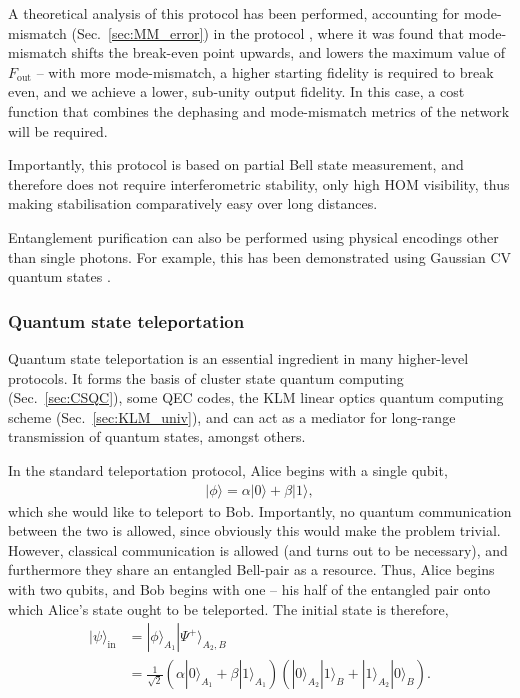 \documentclass[aps,rmp,twocolumn,amsmath,amssymb,nofootinbib,superscriptaddress,longbibliography,floatfix,table-of-contents,eqsecnum]{revtex4-1}
\newcommand{\ket}[1]{|#1\rangle}
\begin{document}
A theoretical analysis of this protocol has been performed, accounting for mode-mismatch (Sec.~\ref{sec:MM_error}) in the protocol \cite{bib:RohdeOptEntPur06}, where it was found that mode-mismatch shifts the break-even point upwards, and lowers the maximum value of $F_\text{out}$ -- with more mode-mismatch, a higher starting fidelity is required to break even, and we achieve a lower, sub-unity output fidelity. In this case, a cost function that combines the dephasing and mode-mismatch metrics of the network will be required.

Importantly, this protocol is based on partial Bell state measurement, and therefore does not require interferometric stability, only high HOM visibility, thus making stabilisation comparatively easy over long distances.

Entanglement purification can also be performed using physical encodings other than single photons. For example, this has been demonstrated using Gaussian CV quantum states \cite{bib:Duan00}.

%
%

\subsubsection{Quantum state teleportation} \label{sec:teleport} 

Quantum state teleportation \cite{???, bib:PRL_70_1895} is an essential ingredient in many higher-level protocols. It forms the basis of cluster state quantum computing (Sec.~\ref{sec:CSQC}), some QEC codes, the KLM linear optics quantum computing scheme (Sec.~\ref{sec:KLM_univ}), and can act as a mediator for long-range transmission of quantum states, amongst others.

In the standard teleportation protocol, Alice begins with a single qubit,
\begin{align}
\ket\phi = \alpha\ket{0} +\beta\ket{1},
\end{align}
which she would like to teleport to Bob. Importantly, no quantum communication between the two is allowed, since obviously this would make the problem trivial. However, classical communication is allowed (and turns out to be necessary), and furthermore they share an entangled Bell-pair as a resource. Thus, Alice begins with two qubits, and Bob begins with one -- his half of the entangled pair onto which Alice's state ought to be teleported. The initial state is therefore,
\begin{align}
\ket\psi_\text{in} &= \ket{\phi}_{A_1} \ket{\Psi^+}_{A_2,B} \\
&= \frac{1}{\sqrt{2}} (\alpha\ket{0}_{A_1}+\beta\ket{1}_{A_1}) (\ket{0}_{A_2}\ket{1}_B + \ket{1}_{A_2}\ket{0}_B). \nonumber
\end{align}
\end{document}
